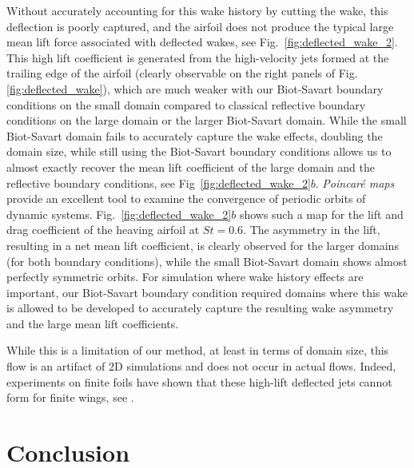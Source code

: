 \documentclass[preprint,12pt]{elsarticle}
\begin{document}
Without accurately accounting for this wake history by cutting the wake, this deflection is poorly captured, and the airfoil does not produce the typical large mean lift force associated with deflected wakes, see Fig.~\ref{fig:deflected_wake_2}. This high lift coefficient is generated from the high-velocity jets formed at the trailing edge of the airfoil (clearly observable on the right panels of Fig.\ref{fig:deflected_wake}), which are much weaker with our Biot-Savart boundary conditions on the small domain compared to classical reflective boundary conditions on the large domain or the larger Biot-Savart domain. While the small Biot-Savart domain fails to accurately capture the wake effects, doubling the domain size, while still using the Biot-Savart boundary conditions allows us to almost exactly recover the mean lift coefficient of the large domain and the reflective boundary conditions, see Fig~\ref{fig:deflected_wake_2}$b$. \emph{Poincar\'e maps} provide an excellent tool to examine the convergence of periodic orbits of dynamic systems. Fig.~\ref{fig:deflected_wake_2}$b$ shows such a map for the lift and drag coefficient of the heaving airfoil at $St=0.6$. The asymmetry in the lift, resulting in a net mean lift coefficient, is clearly observed for the larger domains (for both boundary conditions), while the small Biot-Savart domain shows almost perfectly symmetric orbits. For simulation where wake history effects are important, our Biot-Savart boundary condition required domains where this wake is allowed to be developed to accurately capture the resulting wake asymmetry and the large mean lift coefficients. 

While this is a limitation of our method, at least in terms of domain size, this flow is an artifact of 2D simulations and does not occur in actual flows. Indeed, experiments on finite foils have shown that these high-lift deflected jets cannot form for finite wings, see \cite{Calderon2014OnWings, Godoy-DianaTransitionFoil}.

 
\section{Conclusion}
\end{document}
